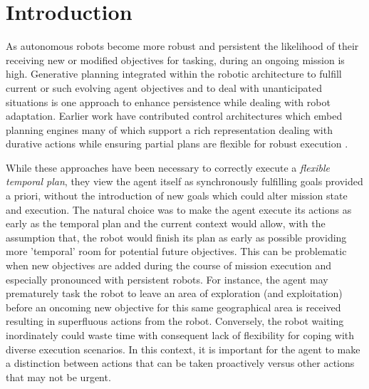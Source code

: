 \section{Introduction}
\label{sec:intro}

As autonomous robots become more robust and persistent the likelihood
of their receiving new or modified objectives for tasking, during an
ongoing mission is high. Generative planning integrated within the
robotic architecture to fulfill current or such evolving agent
objectives and to deal with unanticipated situations is one approach
to enhance persistence while dealing with robot adaptation.  Earlier
work
\cite{AmbrosIngerson88,Haigh98,alami:1998p820,mus98,chien99,mus04,py10}
have contributed control architectures which embed planning engines
many of which support a rich representation dealing with durative
actions while ensuring partial plans are flexible for robust execution
\cite{lemai04}.


While these approaches have been necessary to correctly execute a
\emph{flexible temporal plan}, they view the agent itself as
synchronously fulfilling goals provided a priori, without the
introduction of new goals which could alter mission state and
execution.
The natural choice was to make the agent execute its actions as early
as the temporal plan and the current context would allow, with the
assumption that, the robot would finish its plan as early as possible
providing more 'temporal' room for potential future objectives.  This
can be problematic when new objectives are added during the course of
mission execution and especially pronounced with persistent
robots. For instance, the agent may prematurely task the robot to
leave an area of exploration (and exploitation) before an oncoming new
objective for this same geographical area is received resulting in
superfluous actions from the robot. Conversely, the robot waiting
inordinately could waste time with consequent lack of flexibility for
coping with diverse execution scenarios. In this context, it is
important for the agent to make a distinction between actions that can
be taken proactively versus other actions that may not be urgent.

